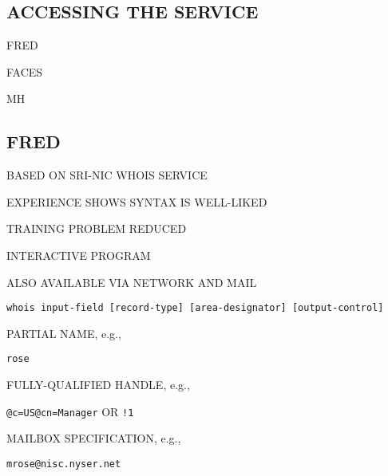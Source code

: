 \begin{bwslide}
\part	{ACCESSING THE SERVICE}\bf

\begin{nrtc}
\item	FRED

\item	FACES

\item	MH
\end{nrtc}
\end{bwslide}


\begin{bwslide}
\part*	{FRED}\bf

\begin{nrtc}
\item	BASED ON SRI-NIC WHOIS SERVICE
    \begin{nrtc}
    \item	EXPERIENCE SHOWS SYNTAX IS WELL-LIKED

    \item	TRAINING PROBLEM REDUCED
    \end{nrtc}

\item	INTERACTIVE PROGRAM
    \begin{nrtc}
    \item	ALSO AVAILABLE VIA NETWORK AND MAIL
    \end{nrtc}
\end{nrtc}
\end{bwslide}


\begin{bwslide}

{\small\begin{verbatim}
whois input-field [record-type] [area-designator] [output-control]
\end{verbatim}}

\begin{nrtc}
\item	PARTIAL NAME, e.g.,
    \begin{nrtc}
    \item	\verb"rose"
    \end{nrtc}

\item	FULLY-QUALIFIED HANDLE, e.g.,
    \begin{nrtc}
    \item	 \verb"@c=US@cn=Manager" OR \verb"!1"
    \end{nrtc}

\item	MAILBOX SPECIFICATION, e.g.,
    \begin{nrtc}
    \item	\verb"mrose@nisc.nyser.net"
    \end{nrtc}
\end{nrtc}
\end{bwslide}


